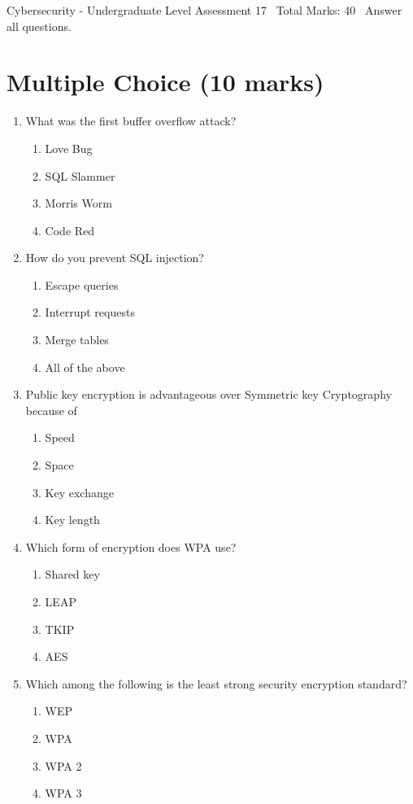 \documentclass[12pt]{article}
\begin{document}
\begin{center}
Cybersecurity - Undergraduate Level Assessment 17 \
Total Marks: 40 \
Answer all questions.
\end{center}

\section*{Multiple Choice (10 marks)}
\begin{enumerate}[label=\arabic*.]
\item What was the first buffer overflow attack?
\begin{enumerate}[label=(\alph*)]
    \item Love Bug
    \item SQL Slammer
    \item Morris Worm
    \item Code Red
\end{enumerate}
\item How do you prevent SQL injection?
\begin{enumerate}[label=(\alph*)]
    \item Escape queries
    \item Interrupt requests
    \item Merge tables
    \item All of the above
\end{enumerate}
\item Public key encryption is advantageous over Symmetric key Cryptography because of
\begin{enumerate}[label=(\alph*)]
    \item Speed
    \item Space
    \item Key exchange
    \item Key length
\end{enumerate}
\item Which form of encryption does WPA use?
\begin{enumerate}[label=(\alph*)]
    \item Shared key
    \item LEAP
    \item TKIP
    \item AES
\end{enumerate}
\item Which among the following is the least strong security encryption standard?
\begin{enumerate}[label=(\alph*)]
    \item WEP
    \item WPA
    \item WPA 2
    \item WPA 3
\end{enumerate}
\end{enumerate}
\end{document}
